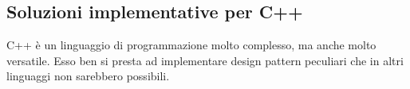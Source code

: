 \subsection{Soluzioni implementative per C++}
C++ è un linguaggio di programmazione molto complesso, ma anche molto versatile. Esso ben si presta 
ad implementare design pattern peculiari che in altri linguaggi non sarebbero possibili.




